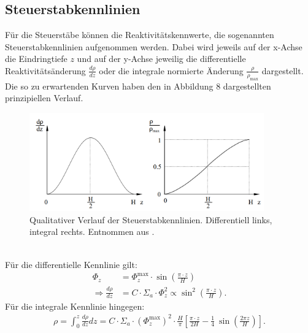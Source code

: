 \documentclass[german,  %
parskip=full,  %
]{scrartcl}
\begin{document}
\subsection{Steuerstabkennlinien}
Für die Steuerstäbe können die Reaktivitätskennwerte, die sogenannten Steuerstabkennlinien aufgenommen werden. Dabei wird jeweils auf der x-Achse die Eindringtiefe $z$ und auf der y-Achse jeweilig die differentielle Reaktivitätsänderung $\frac{d\rho}{dz}$ oder die integrale normierte Änderung $\frac{\rho}{\rho_{\text{max}}}$ dargestellt. Die so zu erwartenden Kurven haben den in Abbildung 8 dargestellten prinzipiellen Verlauf.
\\
\begin{figure}[h!]\centering
\includegraphics[width=0.9\textwidth]{kennlinien}
\caption{Qualitativer Verlauf der Steuerstabkennlinien. Differentiell links, integral rechts. Entnommen aus \cite{2}.}
\end{figure}
\\
Für die differentielle Kennlinie gilt:
\begin{align}
\Phi_z &= \Phi_z^{\text{max}} \cdot \sin\left(\frac{\pi \cdot z}{H} \right) \\
\Rightarrow \frac{d\rho}{dz} &= C \cdot \Sigma_a \cdot \Phi_z^2 \propto \sin^2\left(\frac{\pi \cdot z}{H} \right).
\end{align}
Für die integrale Kennlinie hingegen:
\begin{align}
\rho = \int_0^{z} \frac{d\rho}{dz} dz =  C \cdot \Sigma_a \cdot (\Phi_z^{\text{max}})^2 \cdot \frac{H}{\pi}
\left[\frac{\pi \cdot z}{2H} - \frac{1}{4} \ \sin\left(\frac{2\pi z}{H} \right) \right].
\end{align}
\end{document}
